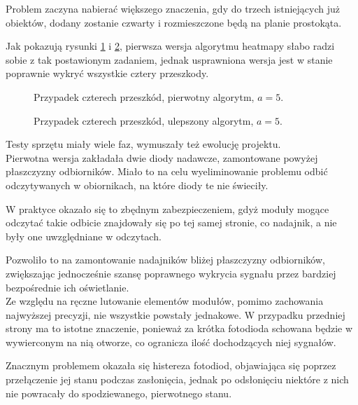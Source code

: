 Problem zaczyna nabierać większego znaczenia, gdy do trzech istniejących już obiektów, dodany zostanie czwarty i rozmieszczone będą na planie prostokąta.

Jak pokazują rysunki \ref{fig:scene_heatmap_5_rect_case} i \ref{fig:scene_heatmap2_5_rect_case}, pierwsza wersja algorytmu heatmapy słabo radzi sobie z tak postawionym zadaniem, jednak usprawniona wersja jest w stanie poprawnie wykryć wszystkie cztery przeszkody.

\begin{figure}
 \centering
 \makebox[\textwidth][r]{
  \resizebox{.9\largefigure}{!}{
    \def\svgwidth{0.9\largefigure}
    
  }
 }
 \caption{Przypadek czterech przeszkód, pierwotny algorytm, $a = 5$.}
 \label{fig:scene_heatmap_5_rect_case}
\end{figure}

\begin{figure}
 \centering
 \makebox[\textwidth][l]{
  \resizebox{.9\largefigure}{!}{
    \def\svgwidth{0.9\largefigure}
    
  }
 }
 \caption{Przypadek czterech przeszkód, ulepszony algorytm, $a = 5$.}
 \label{fig:scene_heatmap2_5_rect_case}
\end{figure}

Testy sprzętu miały wiele faz, wymuszały też ewolucję projektu.\\

Pierwotna wersja zakładała dwie diody nadawcze, zamontowane powyżej płaszczyzny odbiorników. Miało to na celu wyeliminowanie problemu odbić odczytywanych w obiornikach, na które diody te nie świeciły.

W praktyce okazało się to zbędnym zabezpieczeniem, gdyż moduły mogące odczytać takie odbicie znajdowały się po tej samej stronie, co nadajnik, a nie były one uwzględniane w odczytach.

Pozwoliło to na zamontowanie nadajników bliżej płaszczyzny odbiorników, zwiększając jednocześnie szansę poprawnego wykrycia sygnału przez bardziej bezpośrednie ich oświetlanie.\\



Ze względu na ręczne lutowanie elementów modułów, pomimo zachowania najwyższej precyzji, nie wszystkie powstały jednakowe.
W przypadku przedniej strony ma to istotne znaczenie, ponieważ za krótka fotodioda schowana będzie w wywierconym na nią otworze, co ogranicza ilość dochodzących niej sygnałów.

Znacznym problemem okazała się histereza fotodiod, objawiająca się poprzez przełączenie jej stanu podczas zasłonięcia, jednak po odsłonięciu niektóre z nich nie powracały do spodziewanego, pierwotnego stanu.

